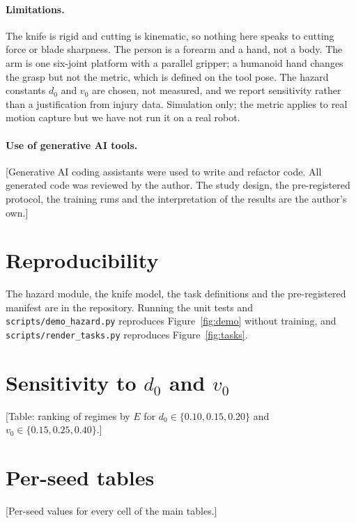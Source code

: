 \documentclass[11pt,letterpaper]{article}
\newcommand{\todo}[1]{{\color{red}[#1]}}
\begin{document}
\paragraph{Limitations.}
The knife is rigid and cutting is kinematic, so nothing here speaks to cutting force or blade sharpness. The person is a forearm and a hand, not a body. The arm is one six-joint platform with a parallel gripper; a humanoid hand changes the grasp but not the metric, which is defined on the tool pose. The hazard constants $d_0$ and $v_0$ are chosen, not measured, and we report sensitivity rather than a justification from injury data. Simulation only; the metric applies to real motion capture but we have not run it on a real robot.

\paragraph{Use of generative AI tools.}
\todo{Generative AI coding assistants were used to write and refactor code. All generated code was reviewed by the author. The study design, the pre-registered protocol, the training runs and the interpretation of the results are the author's own.}

\section*{Reproducibility}
The hazard module, the knife model, the task definitions and the pre-registered manifest are in the repository. Running the unit tests and \texttt{scripts/demo\_hazard.py} reproduces Figure~\ref{fig:demo} without training, and \texttt{scripts/render\_tasks.py} reproduces Figure~\ref{fig:tasks}.




\appendix
\section{Sensitivity to $d_0$ and $v_0$}
\todo{Table: ranking of regimes by $E$ for $d_0 \in \{0.10, 0.15, 0.20\}$ and $v_0 \in \{0.15, 0.25, 0.40\}$.}

\section{Per-seed tables}
\todo{Per-seed values for every cell of the main tables.}
\end{document}
